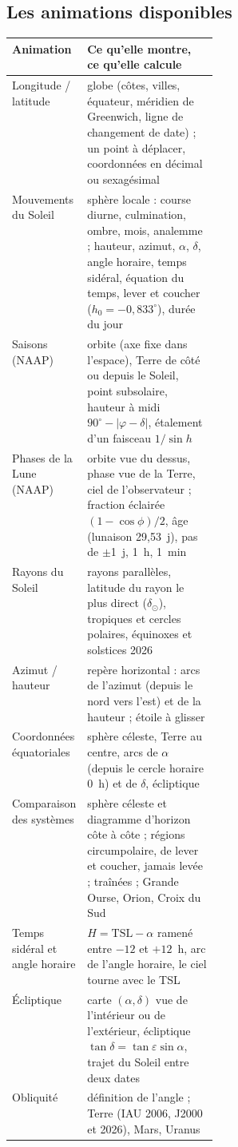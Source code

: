\subsection{Les animations disponibles}
\begin{center}
\small
\begin{tabularx}{\linewidth}{@{}>{\raggedright}p{0.30\linewidth}X@{}}
\toprule
Animation & Ce qu'elle montre, ce qu'elle calcule\\
\midrule
Longitude / latitude & globe (côtes, villes, équateur, méridien de Greenwich, ligne de changement de date) ; un point à déplacer, coordonnées en décimal ou sexagésimal\\
Mouvements du Soleil & sphère locale : course diurne, culmination, ombre, mois, analemme ; hauteur, azimut, $\alpha$, $\delta$, angle horaire, temps sidéral, équation du temps, lever et coucher ($h_0=-0{,}833^\circ$), durée du jour\\
Saisons (NAAP) & orbite (axe fixe dans l'espace), Terre de côté ou depuis le Soleil, point subsolaire, hauteur à midi $90^\circ-|\varphi-\delta|$, étalement d'un faisceau $1/\sin h$\\
Phases de la Lune (NAAP) & orbite vue du dessus, phase vue de la Terre, ciel de l'observateur ; fraction éclairée $(1-\cos\phi)/2$, âge (lunaison 29,53~j), pas de $\pm$1~j, 1~h, 1~min\\
Rayons du Soleil & rayons parallèles, latitude du rayon le plus direct ($\delta_\odot$), tropiques et cercles polaires, équinoxes et solstices 2026\\
Azimut / hauteur & repère horizontal : arcs de l'azimut (depuis le nord vers l'est) et de la hauteur ; étoile à glisser\\
Coordonnées équatoriales & sphère céleste, Terre au centre, arcs de $\alpha$ (depuis le cercle horaire 0~h) et de $\delta$, écliptique\\
Comparaison des systèmes & sphère céleste et diagramme d'horizon côte à côte ; régions circumpolaire, de lever et coucher, jamais levée ; traînées ; Grande Ourse, Orion, Croix du Sud\\
Temps sidéral et angle horaire & $H = \mathrm{TSL}-\alpha$ ramené entre $-12$ et $+12$~h, arc de l'angle horaire, le ciel tourne avec le TSL\\
Écliptique & carte $(\alpha,\delta)$ vue de l'intérieur ou de l'extérieur, écliptique $\tan\delta=\tan\varepsilon\sin\alpha$, trajet du Soleil entre deux dates\\
Obliquité & définition de l'angle ; Terre (IAU 2006, J2000 et 2026), Mars, Uranus\\

\end{tabularx}
\end{center}
